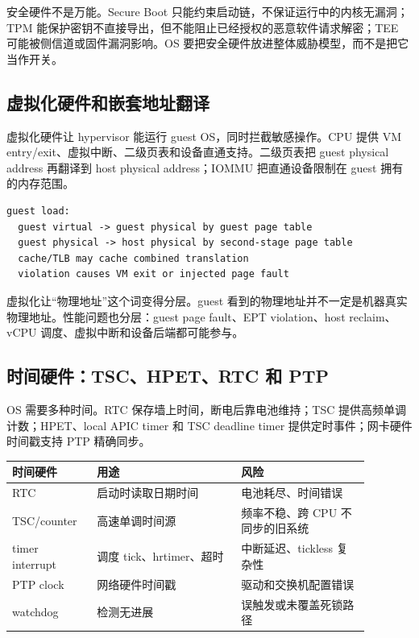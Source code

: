 安全硬件不是万能。Secure Boot 只能约束启动链，不保证运行中的内核无漏洞；TPM 能保护密钥不直接导出，但不能阻止已经授权的恶意软件请求解密；TEE 可能被侧信道或固件漏洞影响。OS 要把安全硬件放进整体威胁模型，而不是把它当作开关。

\subsection{虚拟化硬件和嵌套地址翻译}

虚拟化硬件让 hypervisor 能运行 guest OS，同时拦截敏感操作。CPU 提供 VM entry/exit、虚拟中断、二级页表和设备直通支持。二级页表把 guest physical address 再翻译到 host physical address；IOMMU 把直通设备限制在 guest 拥有的内存范围。

\begin{lstlisting}
guest load:
  guest virtual -> guest physical by guest page table
  guest physical -> host physical by second-stage page table
  cache/TLB may cache combined translation
  violation causes VM exit or injected page fault
\end{lstlisting}

虚拟化让“物理地址”这个词变得分层。guest 看到的物理地址并不一定是机器真实物理地址。性能问题也分层：guest page fault、EPT violation、host reclaim、vCPU 调度、虚拟中断和设备后端都可能参与。

\subsection{时间硬件：TSC、HPET、RTC 和 PTP}

OS 需要多种时间。RTC 保存墙上时间，断电后靠电池维持；TSC 提供高频单调计数；HPET、local APIC timer 和 TSC deadline timer 提供定时事件；网卡硬件时间戳支持 PTP 精确同步。

\begin{longtable}{p{0.2\linewidth}p{0.36\linewidth}p{0.32\linewidth}}
\toprule
时间硬件 & 用途 & 风险 \\
\midrule
RTC & 启动时读取日期时间 & 电池耗尽、时间错误 \\
TSC/counter & 高速单调时间源 & 频率不稳、跨 CPU 不同步的旧系统 \\
timer interrupt & 调度 tick、hrtimer、超时 & 中断延迟、tickless 复杂性 \\
PTP clock & 网络硬件时间戳 & 驱动和交换机配置错误 \\
watchdog & 检测无进展 & 误触发或未覆盖死锁路径 \\
\bottomrule
\end{longtable}

